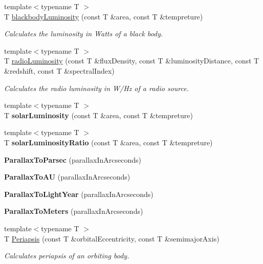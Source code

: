 \begin{DoxyCompactItemize}
{\footnotesize template$<$typename T $>$ }\\T \mbox{\hyperlink{group___e_g_x_phys-_luminosity_ga909f82edfaed449b44e94788b642ebb8}{blackbody\+Luminosity}} (const T \&area, const T \&tempreture)
\begin{DoxyCompactList}\small\item\em Calculates the luminosity in Watts of a black body. \end{DoxyCompactList}\item 
{\footnotesize template$<$typename T $>$ }\\T \mbox{\hyperlink{group___e_g_x_phys-_luminosity_ga6d6865b2aac1bc7c7f06b7c4ac2444e4}{radio\+Luminosity}} (const T \&flux\+Density, const T \&luminosity\+Distance, const T \&redshift, const T \&spectral\+Index)
\begin{DoxyCompactList}\small\item\em Calculates the radio luminosity in W/\+Hz of a radio source. \end{DoxyCompactList}\item 
\mbox{\label{namespace_e_g_x_phys_ade3d05c9dcd810cb5290375d11587b6a}} 
{\footnotesize template$<$typename T $>$ }\\T {\bfseries solar\+Luminosity} (const T \&area, const T \&tempreture)
\item 
\mbox{\label{namespace_e_g_x_phys_ac5e66686d7910587e3636b7984d466e9}} 
{\footnotesize template$<$typename T $>$ }\\T {\bfseries solar\+Luminosity\+Ratio} (const T \&area, const T \&tempreture)
\item 
{\bfseries Parallax\+To\+Parsec} (parallax\+In\+Arcseconds)
\item 
{\bfseries Parallax\+To\+AU} (parallax\+In\+Arcseconds)
\item 
{\bfseries Parallax\+To\+Light\+Year} (parallax\+In\+Arcseconds)
\item 
{\bfseries Parallax\+To\+Meters} (parallax\+In\+Arcseconds)
\item 
{\footnotesize template$<$typename T $>$ }\\T \mbox{\hyperlink{group___e_g_x_phys-_periapsis_ga4414ac75539371ec874a3d25cad6c9fe}{Periapsis}} (const T \&orbital\+Eccentricity, const T \&semimajor\+Axis)
\begin{DoxyCompactList}\small\item\em Calculates periapsis of an orbiting body. \end{DoxyCompactList}\item 

\end{DoxyCompactItemize}
